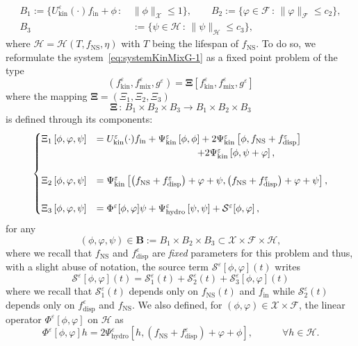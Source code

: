 \documentclass[AHL,Unicode,longabstracts,published]{cedram}
\newcommand{\ini}{\mathrm{in}}
\newcommand{\ns}{\mathrm{NS}}
\newcommand{\hyd}{\mathrm{hydro}}
\newcommand{\mix}{\mathrm{mix}}
\newcommand{\kin}{\mathrm{kin}}
\newcommand{\disp}{\mathrm{disp}}
\renewcommand{\SS}{\mathcal{S}}
\newcommand{\FFF}{\mathscr{F}}
\newcommand{\HHH}{\mathscr{H}}
\newcommand{\GGG}{\mathscr{X}}
\newcommand{\SSSs}{\HHH}
\newcommand{\SSSl}{\GGG}
\newcommand{\SSSm}{\FFF}
\renewcommand*\le{\leqslant}
\newcommand*\eps{{\varepsilon}}
\let\oldforall\forall
\renewcommand*{\forall}{\mathrel{\oldforall}}
\begin{document}
\begin{equation*}
\begin{split}
B_1 := \bigg\{ U^\eps_\kin(\cdot) f_\ini + \phi \, : \, &\| \phi \|_{\SSSl} \le 1 \bigg\}, \qquad B_2 := \bigg\{ \varphi \in \SSSm \, : \, \| \varphi \|_{\SSSm} \le c_2 \bigg\}, \\
B_3 &:= \bigg\{ \psi \in \SSSs \, : \, \| \psi \|_{\SSSs} \le c_3 \bigg\},
\end{split}
\end{equation*}
where $\SSSs=\SSSs(T, f_\ns, \eta)$ with $T$ being the lifespan of $f_\ns$. To do so, we reformulate the system~\eqref{eq:systemKinMixG-1} as a fixed point problem of the type
\[
\left(f^\eps_\kin, f^\eps_\mix, g^\eps\right)=\bm{\Xi}\left[f^\eps_\kin, f^\eps_\mix, g^\eps\right]
\]
where the mapping $\bm{\Xi}=(\Xi_1, \Xi_2, \Xi_3)$
\begin{equation*}
\bm{\Xi} \, : \, B_1\times B_2 \times B_3 \longrightarrow B_1\times B_2\times B_3
\end{equation*}
is defined through its components:
\begin{equation}\label{eq:systemXIi}
\begin{cases}
\Xi_1\left[\phi, \varphi, \psi \right] &= U^\eps_\kin(\cdot) f_\ini + \Psi^\eps_\kin\left[\phi, \phi\right] +2 \Psi^\eps_\kin\left[\phi, f_\ns + f^\eps_\disp\right]\\
&\mkern187mu + 2 \Psi^\eps_\kin\left[\phi, \psi + \varphi\right],\\ \\
\Xi_2\left[\phi, \varphi, \psi\right] &= \Psi^\eps_\kin\left[\left(f_\ns + f^\eps_\disp\right) + \varphi + \psi, \left(f_\ns + f^\eps_\disp\right) + \varphi + \psi \right],\\ \\
\Xi_3\left[\phi, \varphi, \psi\right] &= \Phi^\eps[\phi,\varphi]\psi + \Psi^\eps_\hyd\left[\psi, \psi\right] + \SS^\eps[\phi, \varphi]\,,
\end{cases}
\end{equation}
for any
\[
(\phi,\varphi,\psi) \in \bm{B} := B_1\times B_2 \times B_3 \subset \SSSl \times \SSSm \times \SSSs,
\]
where we recall that $f_\ns$ and $f_\disp^\eps$ are \emph{fixed} parameters for this problem and thus, with a slight abuse of notation, the source term $\SS^\eps[\phi,\varphi](t)$ writes
\[
\SS^\eps[\phi,\varphi](t)=\SS_1^\eps(t)+\SS^\eps_2(t)+\SS^\eps_3[\phi,\varphi](t)
\]
where we recall that $\SS_1^\eps(t)$ depends only on $f_\ns(t)$ and $f_\ini$ while $\SS_2^\eps(t)$ depends only on $f_\disp^\eps$ and $f_\ns$. We also defined, for $(\phi,\varphi) \in \SSSl \times \SSSm$, the linear operator $\Phi^\eps[\phi,\varphi]$ on $\SSSs$ as
\[
\Phi^\eps\left[\phi,\varphi\right]h=2\Psi_\hyd^\eps\left[h,\left(f_\ns+f_\disp^\eps\right)+\varphi+\phi\right], \qquad \quad \forall h\in \SSSs.
\]
\end{document}
